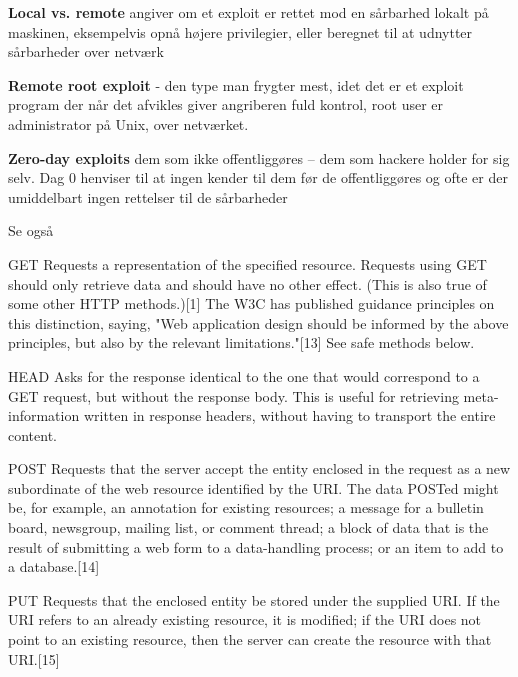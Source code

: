 \documentclass[Screen16to9,17pt]{foils}
\begin{document}

\begin{list1}
\item {\bfseries Local vs. remote}
angiver om et exploit er rettet mod
en sårbarhed lokalt på maskinen, eksempelvis
opnå højere privilegier, eller beregnet
til at udnytter sårbarheder over netværk
\item {\bfseries Remote root exploit}
- den type man frygter mest, idet
det er et exploit program der når det afvikles giver
angriberen fuld kontrol, root user er administrator
på Unix, over netværket.
\item {\bfseries Zero-day exploits} dem som ikke offentliggøres -- dem
  som hackere holder for sig selv. Dag 0 henviser til at ingen kender
  til dem før de offentliggøres og ofte er der umiddelbart ingen
  rettelser til de sårbarheder
\end{list1}




\centerline{}





Se også 


\begin{list2}
\item [GET]{\small
Requests a representation of the specified resource. Requests using GET should only retrieve data and should have no other effect. (This is also true of some other HTTP methods.)[1] The W3C has published guidance principles on this distinction, saying, "Web application design should be informed by the above principles, but also by the relevant limitations."[13] See safe methods below.}
\item [HEAD]{\small
Asks for the response identical to the one that would correspond to a GET request, but without the response body. This is useful for retrieving meta-information written in response headers, without having to transport the entire content.}
\item [POST]{\small
Requests that the server accept the entity enclosed in the request as a new subordinate of the web resource identified by the URI. The data POSTed might be, for example, an annotation for existing resources; a message for a bulletin board, newsgroup, mailing list, or comment thread; a block of data that is the result of submitting a web form to a data-handling process; or an item to add to a database.[14]}
\item [PUT]{\small
Requests that the enclosed entity be stored under the supplied URI. If the URI refers to an already existing resource, it is modified; if the URI does not point to an existing resource, then the server can create the resource with that URI.[15]}
\end{list2}
\end{document}
